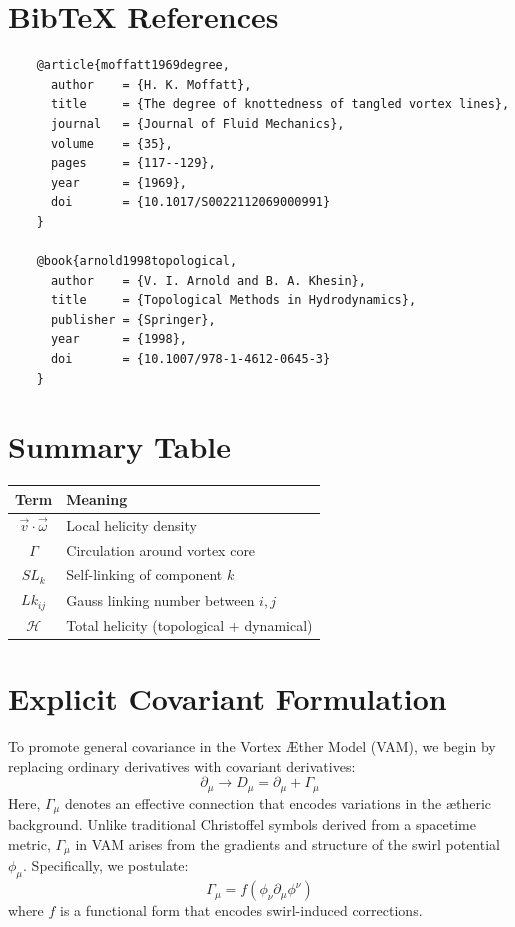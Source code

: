 \documentclass[a4paper,12pt]{article}
\begin{document}
    \section*{BibTeX References}
    \begin{verbatim}
    @article{moffatt1969degree,
      author    = {H. K. Moffatt},
      title     = {The degree of knottedness of tangled vortex lines},
      journal   = {Journal of Fluid Mechanics},
      volume    = {35},
      pages     = {117--129},
      year      = {1969},
      doi       = {10.1017/S0022112069000991}
    }

    @book{arnold1998topological,
      author    = {V. I. Arnold and B. A. Khesin},
      title     = {Topological Methods in Hydrodynamics},
      publisher = {Springer},
      year      = {1998},
      doi       = {10.1007/978-1-4612-0645-3}
    }
    \end{verbatim}

\section*{Summary Table}
\begin{tabular}{|c|l|}
    \hline
    \textbf{Term} & \textbf{Meaning} \\
    \hline
    $\vec{v} \cdot \vec{\omega}$ & Local helicity density \\
    $\Gamma$ & Circulation around vortex core \\
    $SL_k$ & Self-linking of component $k$ \\
    $Lk_{ij}$ & Gauss linking number between $i,j$ \\
    $\mathcal{H}$ & Total helicity (topological + dynamical) \\
    \hline
\end{tabular}



\section{Explicit Covariant Formulation}\label{sec:explicit-covariant-formulation}
        To promote general covariance in the Vortex Æther Model (VAM), we begin by replacing ordinary derivatives with covariant derivatives:
        \begin{equation}
            \partial_\mu \rightarrow D_\mu = \partial_\mu + \Gamma_\mu
        \end{equation}
        Here, $\Gamma_\mu$ denotes an effective connection that encodes variations in the ætheric background. Unlike traditional Christoffel symbols derived from a spacetime metric, $\Gamma_\mu$ in VAM arises from the gradients and structure of the swirl potential $\phi_\mu$. Specifically, we postulate:
        \begin{equation}
            \Gamma_\mu = f(\phi_\nu \partial_\mu \phi^\nu)
        \end{equation}
        where $f$ is a functional form that encodes swirl-induced corrections.
\end{document}

